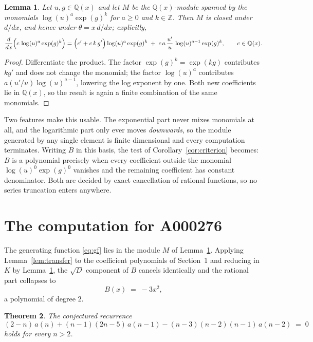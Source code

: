 \documentclass[11pt,a4paper]{article}
\theoremstyle{plain}
\newtheorem{theorem}{Theorem}
\newtheorem{lemma}[theorem]{Lemma}
\theoremstyle{definition}
\begin{document}
\begin{lemma}\label{lem:field}
Let $u,g\in\mathbb{Q}(x)$ and let $M$ be the $\mathbb{Q}(x)$-module spanned by the
monomials $\log(u)^{a}\exp(g)^{k}$ for $a\ge0$ and $k\in\mathbb{Z}$. Then $M$ is closed
under $d/dx$, and hence under $\theta=x\,d/dx$; explicitly,
\[
\frac{d}{dx}\Bigl(c\,\log(u)^{a}\exp(g)^{k}\Bigr)
=\Bigl(c'+c\,k\,g'\Bigr)\log(u)^{a}\exp(g)^{k}
\;+\;c\,a\,\frac{u'}{u}\,\log(u)^{a-1}\exp(g)^{k},
\qquad c\in\mathbb{Q}(x).
\]
\end{lemma}

\begin{proof}
Differentiate the product. The factor $\exp(g)^{k}=\exp(kg)$ contributes $kg'$ and does
not change the monomial; the factor $\log(u)^{a}$ contributes $a(u'/u)\log(u)^{a-1}$,
lowering the log exponent by one. Both new coefficients lie in $\mathbb{Q}(x)$, so the
result is again a finite combination of the same monomials.
\end{proof}

Two features make this usable. The exponential part never mixes monomials at all, and the
logarithmic part only ever moves \emph{downwards}, so the module generated by any single
element is finite dimensional and every computation terminates. Writing $B$ in this basis,
the test of Corollary~\ref{cor:criterion} becomes: $B$ is a polynomial precisely when every
coefficient outside the monomial $\log(u)^{0}\exp(g)^{0}$ vanishes and the remaining
coefficient has constant denominator. Both are decided by exact cancellation of rational
functions, so no series truncation enters anywhere.

\section{The computation for A000276}

The generating function \eqref{eq:gf} lies in the module $M$ of
Lemma~\ref{lem:field}.
Applying Lemma~\ref{lem:transfer} to the coefficient polynomials of Section~1 and reducing
in $K$ by Lemma~\ref{lem:field}, the $\sqrt{D}$ component of $B$ cancels identically and
the rational part collapses to
\[
B(x)\;=\;- 3 x^{2} ,
\]
a polynomial of degree $2$.

\begin{theorem}
The conjectured recurrence
\[
(2 - n)\,a(n) + \left(n - 1\right) \left(2 n - 5\right)\,a(n-1) -  \left(n - 3\right) \left(n - 2\right) \left(n - 1\right)\,a(n-2) \;=\;0
\]
holds for every $n>2$.
\end{theorem}
\end{document}
